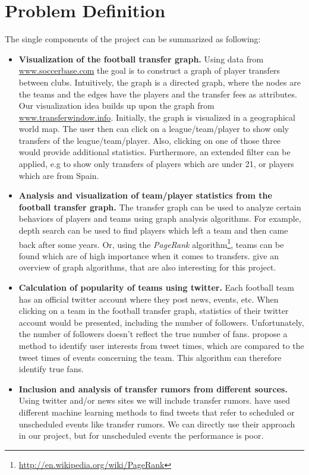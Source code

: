 \documentclass{article}
\begin{document}
\section{Problem Definition}
\label{problemdef}
The single components of the project can be summarized as following:
\begin{itemize}
	\item \textbf{Visualization of the football transfer graph.} Using data from \url{www.soccerbase.com} the goal is to construct a graph of player transfers between clubs. Intuitively, the graph is a directed graph, where the nodes are the teams and the edges have the players and the transfer fees as attributes. Our visualization idea builds up upon the graph from \url{www.transferwindow.info}. Initially, the graph is visualized in a geographical world map. The user then can click on a league/team/player to show only transfers of the league/team/player. Also, clicking on one of those three would provide additional statistics. Furthermore, an extended filter can be applied, e.g to show only transfers of players which are under 21, or players which are from Spain.
	
	\item \textbf{Analysis and visualization of team/player statistics from the football transfer graph.} The transfer graph can be used to analyze certain behaviors of players and teams using graph analysis algorithms. For example, depth search can be used to find players which left a team and then came back after some years. Or, using the \emph{PageRank} algorithm\footnote{\url{http://en.wikipedia.org/wiki/PageRank}}, teams can be found which are of high importance when it comes to transfers. \cite{brath} give an overview of graph algorithms, that are also interesting for this project.
	
	\item \textbf{Calculation of popularity of teams using twitter.} Each football team has an official twitter account where they post news, events, etc. When clicking on a team in the football transfer graph, statistics of their twitter account would be presented, including the number of followers. Unfortunately, the number of followers doesn't reflect the true number of fans. \cite{Ramasamy:2013:IUI:2512938.2512960} propose a method to identify user interests from tweet times, which are compared to the tweet times of events concerning the team. This algorithm can therefore identify true fans.
	
	\item \textbf{Inclusion and analysis of transfer rumors from different sources.} Using twitter and/or news sites we will include transfer rumors. \cite{Kunneman+12} have used different machine learning methods to find tweets that refer to scheduled or unscheduled events like transfer rumors. We can directly use their approach in our project, but for unscheduled events the performance is poor.
	

\end{itemize}
\end{document}
